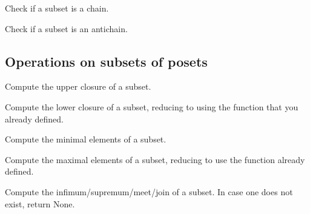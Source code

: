 \begin{exercise}
\begin{exercise}
Check if a subset is a chain.
\end{exercise}

\begin{exercise}
Check if a subset is an antichain.
\end{exercise}

\subsection{Operations on subsets of posets}

\begin{exercise}
Compute the upper closure of a subset.

\end{exercise}


\begin{exercise}
Compute the lower closure of a subset, reducing to
using the function  that you
already defined.

\end{exercise}



\begin{exercise}
Compute the minimal elements of a subset.


\end{exercise}


\begin{exercise}
Compute the maximal elements of a subset, reducing
to use the function  already defined.


\end{exercise}


\begin{exercise}
Compute the infimum/supremum/meet/join of a subset.
In case one does not exist, return None.


\end{exercise}


\end{exercise}
